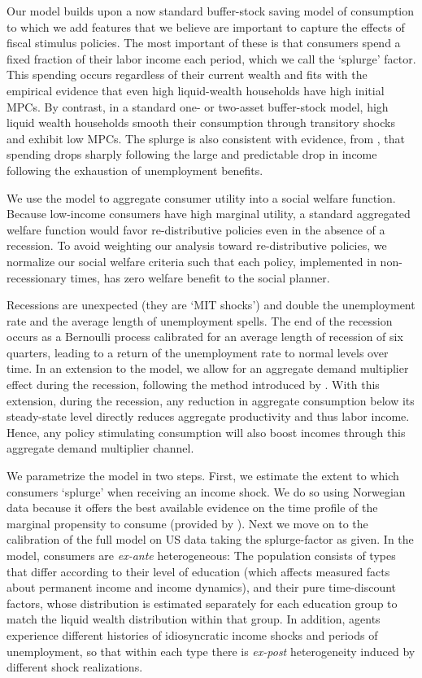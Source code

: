 \documentclass[../HAFiscal]{subfiles}
\begin{document}
Our model builds upon a now standard buffer-stock saving model of consumption to which we add features that we believe are important to capture the effects of fiscal stimulus policies. The most important of these is that consumers spend a fixed fraction of their labor income each period, which we call the `splurge' factor. This spending occurs regardless of their current wealth and fits with the empirical evidence that even high liquid-wealth households have high initial MPCs. By contrast, in a standard one- or two-asset buffer-stock model, high liquid wealth households smooth their consumption through transitory shocks and exhibit low MPCs. The splurge is also consistent with evidence, from \cite{ganongConsumer2019}, that spending drops sharply following the large and predictable drop in income following the exhaustion of unemployment benefits. 

We use the model to aggregate consumer utility into a social welfare function. Because low-income consumers have high marginal utility, a standard aggregated welfare function would favor re-distributive policies even in the absence of a recession. To avoid weighting our analysis toward re-distributive policies, we normalize our social welfare criteria such that each policy, implemented in non-recessionary times, has zero welfare benefit to the social planner. 

Recessions are unexpected (they are `MIT shocks') and double the unemployment rate and the average length of unemployment spells. The end of the recession occurs as a Bernoulli process calibrated for an average length of recession of six quarters, leading to a return of the unemployment rate to normal levels over time. In an extension to the model, we allow for an aggregate demand multiplier effect during the recession, following the method introduced by \cite{kmpHandbook2016}. With this extension, during the recession, any reduction in aggregate consumption below its steady-state level directly reduces aggregate productivity and thus labor income. Hence, any policy stimulating consumption will also boost incomes through this aggregate demand multiplier channel.

We parametrize the model in two steps.  First, we estimate the extent to which consumers `splurge' when receiving an income shock. We do so using Norwegian data because it offers the best available evidence on the time profile of the marginal propensity to consume (provided by \cite{fagereng_mpc_2021}). Next we move on to the calibration of the full model on US data taking the splurge-factor as given. In the model, consumers are \textit{ex-ante} heterogeneous: The population consists of types that differ according to their level of education (which affects measured facts about permanent income and income dynamics), and their pure time-discount factors, whose distribution is estimated separately for each education group to match the liquid wealth distribution within that group. In addition, agents experience different histories of idiosyncratic income shocks and periods of unemployment, so that within each type there is \textit{ex-post} heterogeneity induced by different shock realizations. 
\end{document}
